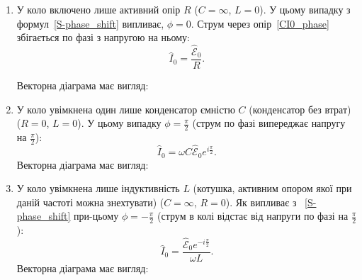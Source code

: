 \begin{enumerate}
\item У коло включено лише активний опір $R$ ($C=\infty$, $L = 0$). У цьому
випадку з формул~\eqref{S-phase_shift} випливає, $\phi = 0$. Струм через опір~\eqref{CI0_phase} збігається по фазі з напругою на ньому:
\[
    \hat{I}_0 = \frac{\hat{\mathcal{E}}_{0}}{R}.
\]

Векторна діаграма має вигляд:
\begin{center}
\end{center}
\item У коло увімкнена один лише конденсатор ємністю $C$ (конденсатор без втрат) ($R=0$, $L = 0$). У цьому випадку $\phi = \frac\pi2$ (струм по фазі випереджає напругу на $\frac\pi2$):
\[
    \hat{I}_0 = \omega C\hat{\mathcal{E}}_{0}e^{i\frac\pi2}.
\]
Векторна діаграма має вигляд:
\begin{center}
\end{center}
\item  У коло увімкнена лише  індуктивність  $L$ (котушка, активним опором якої при даній частоті можна знехтувати) ($C=\infty$, $R = 0$). Як випливає з ~\eqref{S-phase_shift} при-цьому $\phi = -\frac\pi2$ (струм
в колі відстає від напруги по фазі на $\frac\pi2$):
\[
    \hat{I}_0 = \frac{\hat{\mathcal{E}}_{0}e^{-i\frac\pi2}}{\omega L}.
\]
Векторна діаграма має вигляд:
\begin{center}
\end{center}
\end{enumerate}
